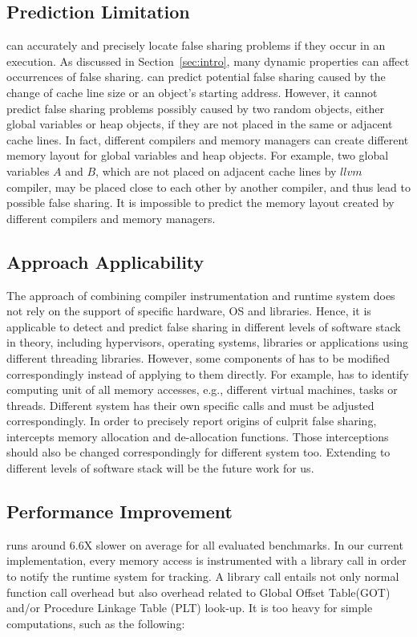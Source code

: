 \label{sec:discussion}

\subsection{Prediction Limitation}
\Predator{} can accurately and precisely locate false sharing problems if they occur
in an execution. 
As discussed in Section~\ref{sec:intro}, many dynamic properties
can affect occurrences of false sharing. 
\Predator{} can predict potential false sharing caused by the change of cache line size 
or an object's starting address.
However, it cannot predict false sharing problems possibly caused by two random objects,
either global variables or heap objects, if they are not placed in the same or adjacent cache lines.
In fact, different compilers and memory managers can create 
different memory layout for global variables and heap objects. 
For example, two global variables $A$ and $B$, which are not placed 
on adjacent cache lines by $llvm$ compiler, may be placed 
close to each other by another compiler, and thus lead to possible false sharing. 
It is impossible to predict the memory layout created by different compilers and memory managers.

\subsection{Approach Applicability}
The approach of combining compiler instrumentation and runtime system 
does not rely on the support of specific hardware, OS and libraries.
Hence, it is applicable to detect and predict false sharing in different levels of 
software stack in theory, including hypervisors, operating systems, libraries or 
applications using different threading libraries.
However, some components of \Predator{} has to be 
modified correspondingly instead of applying to them directly.
For example, \Predator{} has to identify computing unit of all memory accesses, 
e.g., different virtual machines, tasks or threads. 
Different system has their own specific calls and must be adjusted correspondingly.
In order to precisely report origins of culprit false sharing, \Predator{} intercepts 
memory allocation and de-allocation functions. 
Those interceptions should also be changed correspondingly for different system too.
Extending \Predator{} to different levels of software stack will be the future work for us.

\subsection{Performance Improvement}
\Predator{} runs around $6.6$X slower on average for all evaluated benchmarks. 
In our current implementation, every memory access is instrumented with a library call 
in order to notify the runtime system for tracking.
A library call entails not only normal function call overhead but also 
overhead related to Global Offset Table(GOT) and/or Procedure Linkage Table (PLT) look-up. 
It is too heavy for simple computations, such as the following:

